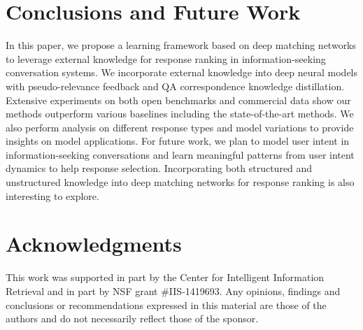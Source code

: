 \section{Conclusions and Future Work}
\label{sec:conclu}

In this paper, we propose a learning framework based on deep matching networks to leverage external knowledge for response ranking in information-seeking conversation systems. We incorporate external knowledge into deep neural models with pseudo-relevance feedback and QA correspondence knowledge distillation. Extensive experiments %
on both open benchmarks and commercial data show our methods outperform various baselines including the state-of-the-art methods. %
We also perform analysis on different response types and model variations to provide insights on model applications. For future work, we plan to model user intent in information-seeking conversations and learn meaningful patterns from user intent dynamics to help response selection. Incorporating both structured and unstructured knowledge into deep matching networks for response ranking is also interesting to explore. %


\section{Acknowledgments}
This work was supported in part by the Center for Intelligent Information Retrieval and in part by NSF grant \#IIS-1419693. Any opinions, findings and conclusions or recommendations expressed in this material are those of the authors and do not necessarily reflect those of the sponsor.




